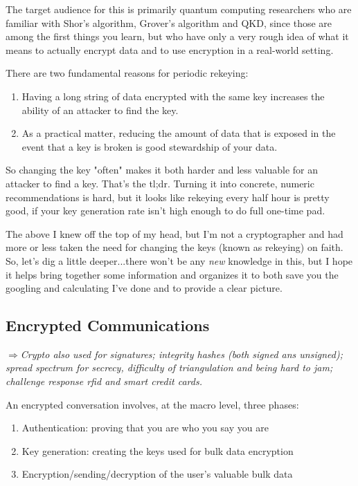 \documentclass[%
 aip,
 jmp,%
 amsmath,amssymb,
 reprint,%
]{revtex4-1}
\def\comment#1{{\color{ForestGreen}$\Rightarrow${\small\em #1}}}
\begin{document}
The target audience for this is primarily quantum computing
researchers who are familiar with Shor's algorithm, Grover's algorithm
and QKD, since those are among the first things you learn, but who
have only a very rough idea of what it means to actually encrypt data
and to use encryption in a real-world setting.

There are two fundamental reasons for periodic rekeying:

\begin{enumerate}
\item Having a long string of data encrypted with the same key increases
the ability of an attacker to find the key.
\item As a practical matter, reducing the amount of data that is exposed
in the event that a key is broken is good stewardship of your data.
\end{enumerate}

So changing the key "often" makes it both harder and less valuable for
an attacker to find a key.  That's the tl;dr.  Turning it into
concrete, numeric recommendations is hard, but it looks like rekeying
every half hour is pretty good, if your key generation rate isn't high
enough to do full one-time pad.

The above I knew off the top of my head, but I'm not a cryptographer
and had more or less taken the need for changing the keys (known as
rekeying) on faith.  So, let's dig a little deeper...there won't be
any \emph{new} knowledge in this, but I hope it helps bring together some
information and organizes it to both save you the googling and
calculating I've done and to provide a clear picture.

\subsection{Encrypted Communications}

\comment{Crypto also used for signatures; integrity hashes (both
  signed ans unsigned); spread spectrum for secrecy, difficulty of
  triangulation and being hard to jam; challenge response rfid and
  smart credit cards.}

An encrypted conversation involves, at the macro level, three phases:

\begin{enumerate}
\item Authentication: proving that you are who you say you are
\item Key generation: creating the keys used for bulk data encryption
\item Encryption/sending/decryption of the user's valuable bulk data
\end{enumerate}
\end{document}
